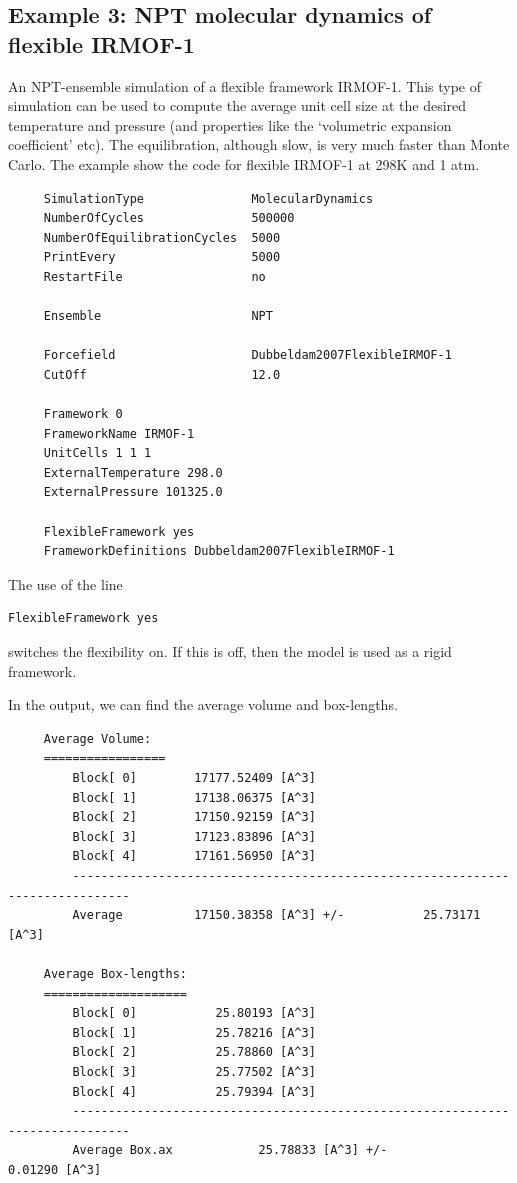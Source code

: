 \subsection*{Example 3: NPT molecular dynamics of flexible IRMOF-1}

An NPT-ensemble simulation of a flexible framework IRMOF-1. This type of simulation can be used to compute the average
unit cell size at the desired temperature and pressure (and properties like the `volumetric expansion coefficient' etc).
The equilibration, although slow, is very much faster than Monte Carlo. The example show the code for flexible
IRMOF-1 at 298K and 1 atm.

\begin{tiny}
\begin{verbatim}
     SimulationType               MolecularDynamics
     NumberOfCycles               500000
     NumberOfEquilibrationCycles  5000
     PrintEvery                   5000
     RestartFile                  no
     
     Ensemble                     NPT
     
     Forcefield                   Dubbeldam2007FlexibleIRMOF-1
     CutOff                       12.0
     
     Framework 0
     FrameworkName IRMOF-1
     UnitCells 1 1 1
     ExternalTemperature 298.0
     ExternalPressure 101325.0
     
     FlexibleFramework yes
     FrameworkDefinitions Dubbeldam2007FlexibleIRMOF-1
\end{verbatim}
\end{tiny}

\noindent
The use of the line
\begin{tiny}
\begin{verbatim}
FlexibleFramework yes
\end{verbatim}
\end{tiny}
switches the flexibility on. If this is off, then the model is used as a rigid framework.

\noindent
In the output, we can find the average volume and box-lengths.
\begin{tiny}
\begin{verbatim}
     Average Volume:
     =================
         Block[ 0]        17177.52409 [A^3]
         Block[ 1]        17138.06375 [A^3]
         Block[ 2]        17150.92159 [A^3]
         Block[ 3]        17123.83896 [A^3]
         Block[ 4]        17161.56950 [A^3]
         ------------------------------------------------------------------------------
         Average          17150.38358 [A^3] +/-           25.73171 [A^3]
     
     Average Box-lengths:
     ====================
         Block[ 0]           25.80193 [A^3]
         Block[ 1]           25.78216 [A^3]
         Block[ 2]           25.78860 [A^3]
         Block[ 3]           25.77502 [A^3]
         Block[ 4]           25.79394 [A^3]
         ------------------------------------------------------------------------------
         Average Box.ax            25.78833 [A^3] +/-            0.01290 [A^3]
\end{verbatim}
\end{tiny}


